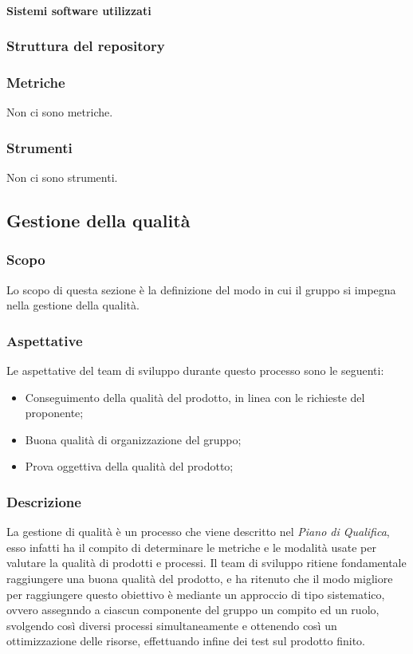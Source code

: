 \paragraph{Sistemi software utilizzati}
\subsubsection{Struttura del repository}
\subsubsection{Metriche}
Non ci sono metriche.
\subsubsection{Strumenti}
Non ci sono strumenti.

\subsection{Gestione della qualità}\label{subsection: gestione_qualita}
\subsubsection{Scopo}
Lo scopo di questa sezione è la definizione del modo in cui il gruppo si impegna nella gestione della qualità.
\subsubsection{Aspettative}
Le aspettative del team di sviluppo durante questo processo sono le seguenti:
\begin {itemize}
    \item Conseguimento della qualità del prodotto, in linea con le richieste del proponente;
    \item Buona qualità di organizzazione del gruppo;
    \item Prova oggettiva della qualità del prodotto;
\end {itemize}
\subsubsection{Descrizione}
La gestione di qualità è un processo che viene descritto nel \textit{Piano di Qualifica}, esso infatti ha il compito di determinare le metriche e le modalità usate per valutare la qualità di prodotti e processi.
Il team di sviluppo ritiene fondamentale raggiungere una buona qualità del prodotto, e ha ritenuto che il modo migliore per raggiungere questo obiettivo è mediante un approccio di tipo sistematico, ovvero assegnndo a ciascun componente del gruppo un compito ed un ruolo, svolgendo così diversi processi simultaneamente e ottenendo così un ottimizzazione delle risorse, effettuando infine dei test sul prodotto finito. 
